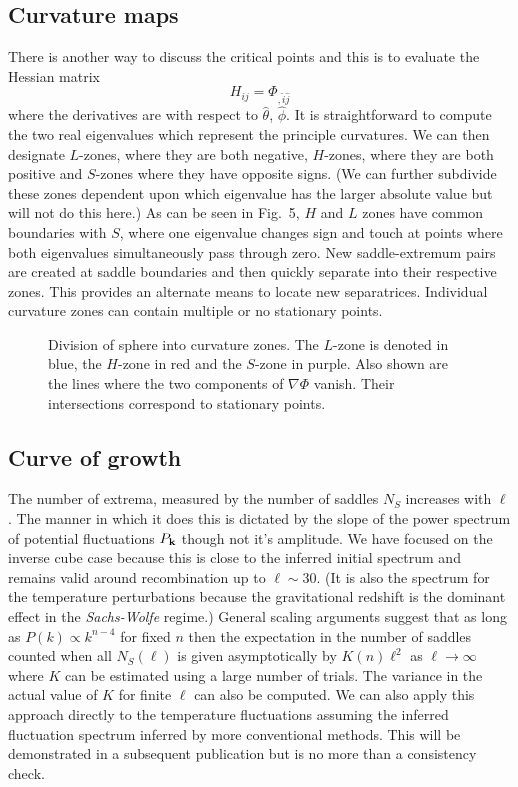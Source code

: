 \documentclass[12pt]{article}
\begin{document}
\subsection{Curvature maps}
There is another way to discuss the critical points and this is to evaluate the Hessian matrix
\begin{equation}
H_{ij}=\Phi_{,{\hat i}{\hat j}}
\end{equation}
where the derivatives are with respect to $\hat\theta$, $\hat\phi$. It is straightforward to compute the two real eigenvalues which represent the principle curvatures. We can then designate $L$-zones, where they are both negative, $H$-zones, where they are both positive and $S$-zones  where they have opposite signs. (We can further subdivide these zones dependent upon which eigenvalue has the larger absolute value but will not do this here.)  As can be seen in Fig.~5, $H$ and $L $ zones have common boundaries with $S$, where one eigenvalue changes sign and touch at points where both eigenvalues simultaneously pass through zero.  New saddle-extremum pairs are created at saddle boundaries and then quickly separate into their respective zones. This provides an alternate means to locate new separatrices. Individual curvature zones can contain multiple or no stationary points.

\begin{figure}[h!]
\centering
\caption{Division of sphere into curvature zones. The $L$-zone is denoted in blue, the $H$-zone in red and the $S$-zone in purple. Also shown are the lines where the two components of $\nabla\Phi$ vanish. Their intersections correspond to stationary points.}
\end{figure}

\subsection{Curve of growth}
The number of extrema, measured by the number of saddles $N_S$ increases with $\ell$. The manner in which it does this is dictated by the slope of the power spectrum of potential fluctuations $P_{\bf k}$ though not it's amplitude. We have focused on the inverse cube case because this is close to the inferred initial spectrum and remains valid around recombination up to $\ell\sim30$. (It is also the spectrum for the temperature perturbations because the gravitational redshift is the dominant effect in the \emph{Sachs-Wolfe} regime.) General scaling arguments suggest that as long as $P(k)\propto k^{n-4}$ for fixed $n$ then the expectation in the number of saddles counted when all $N_S(\ell)$ is given asymptotically by $K(n)\ell^2$ as $\ell\rightarrow\infty$ where $K$ can be estimated using a large number of  trials. The variance in the actual value of $K$ for finite $\ell$ can also be computed. We can also apply this approach directly to the temperature fluctuations assuming the inferred fluctuation spectrum inferred by more conventional methods. This will be demonstrated in a subsequent publication but is no more than a consistency check.
\end{document}
